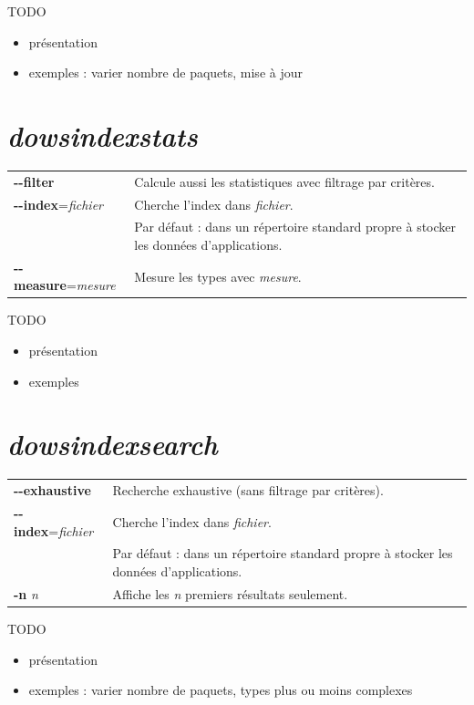 \documentclass [a4paper] {report}
\theoremstyle {definition}
\newcommand {\dowsindex} {\textit{dowsindex}\xspace}
\begin{document}
TODO
\begin {itemize}
	\item présentation
	\item exemples : varier nombre de paquets, mise à jour
\end {itemize}

\section {\dowsindex \textit {stats}}

\begin {table} [h]
\begin {tabular} {ll}
		\textbf {-{}-filter} &
		Calcule aussi les statistiques avec filtrage par critères.
	\\
		\textbf{-{}-index}=\textit{fichier} &
		Cherche l'index dans \textit {fichier}. \\ &
		Par défaut : dans un répertoire standard propre à stocker les données d'applications.
	\\
		\textbf{-{}-measure}=\textit{mesure} &
		Mesure les types avec \textit {mesure}.
\end {tabular}
\end {table}

TODO
\begin {itemize}
	\item présentation
	\item exemples
\end {itemize}

\section {\dowsindex \textit {search}}

\begin {table} [h]
\begin {tabular} {ll}
		\textbf {-{}-exhaustive} &
		Recherche exhaustive (sans filtrage par critères).
	\\
		\textbf{-{}-index}=\textit{fichier} &
		Cherche l'index dans \textit {fichier}. \\ &
		Par défaut : dans un répertoire standard propre à stocker les données d'applications.
	\\
		\textbf {-n} \textit {n} &
		Affiche les \textit {n} premiers résultats seulement.
\end {tabular}
\end {table}

TODO
\begin {itemize}
	\item présentation
	\item exemples : varier nombre de paquets, types plus ou moins complexes
\end {itemize}
\end{document}
